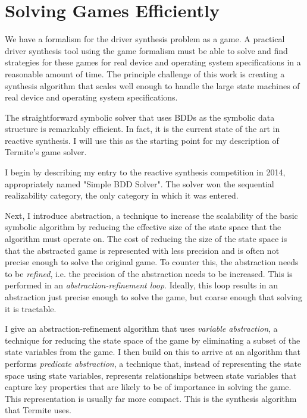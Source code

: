 \chapter{Solving Games Efficiently}

We have a formalism for the driver synthesis problem as a game. A practical driver synthesis tool using the game formalism must be able to solve and find strategies for these games for real device and operating system specifications in a reasonable amount of time. The principle challenge of this work is creating a synthesis algorithm that scales well enough to handle the large state machines of real device and operating system specifications. 

The straightforward symbolic solver that uses BDDs as the symbolic data structure is remarkably efficient. In fact, it is the current state of the art in reactive synthesis. I will use this as the starting point for my description of Termite's game solver.

I begin by describing my entry to the reactive synthesis competition in 2014, appropriately named "Simple BDD Solver". The solver won the sequential realizability category, the only category in which it was entered.  

Next, I introduce abstraction, a technique to increase the scalability of the basic symbolic algorithm by reducing the effective size of the state space that the algorithm must operate on. The cost of reducing the size of the state space is that the abstracted game is represented with less precision and is often not precise enough to solve the original game. To counter this, the abstraction needs to be \emph{refined}, i.e. the precision of the abstraction needs to be increased. This is performed in an \emph{abstraction-refinement loop}. Ideally, this loop results in an abstraction just precise enough to solve the game, but coarse enough that solving it is tractable.

I give an abstraction-refinement algorithm that uses \emph{variable abstraction}, a technique for reducing the state space of the game by eliminating a subset of the state variables from the game. I then build on this to arrive at an algorithm that performs \emph{predicate abstraction}, a technique that, instead of representing the state space using state variables, represents relationships between state variables that capture key properties that are likely to be of importance in solving the game. This representation is usually far more compact. This is the synthesis algorithm that Termite uses.


